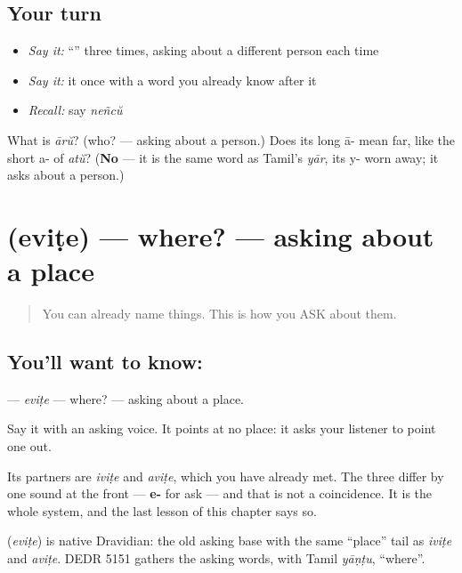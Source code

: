 \subsection*{Your turn}
\begin{itemize}
\raggedright
  \item \emph{Say it:} \textquotedblleft{}\textquotedblright{} three times, asking about a different person each time
  \item \emph{Say it:} it once with a word you already know after it
  \item \emph{Recall:} say \emph{neñcŭ}
\end{itemize}

\begin{tcolorbox}[breakable,colback=teal!4,colframe=teal!35!black,title={Before you move on}]
What is \emph{ārŭ}? (who? — asking about a person.) Does its long ā- mean far, like the short a- of \emph{atŭ}? (\textbf{No} — it is the same word as Tamil's \emph{yār}, its y- worn away; it asks about a person.)
\end{tcolorbox}
\section[\texorpdfstring{\ml{എവിടെ} (eviṭe)}{എവിടെ (eviṭe)}]{ (eviṭe) — where? — asking about a place}

\label{lesson:ML-C41-where}



\begin{quote}
You can already name things. This is how you ASK about them.
\end{quote}

\subsection*{You'll want to know: }
\textbf{} — \emph{eviṭe} — where? — asking about a place.

Say it with an asking voice. It points at no place: it asks your listener to point one out.

Its partners are \textbf{} \emph{iviṭe} and \textbf{} \emph{aviṭe}, which you have already met. The three differ by one sound at the front — \textbf{e-} for ask — and that is not a coincidence. It is the whole system, and the last lesson of this chapter says so.

\begin{cousinweb}
\textbf{} (\emph{eviṭe}) is native Dravidian: the old asking base with the same \textquotedblleft{}place\textquotedblright{} tail as \emph{iviṭe} and \emph{aviṭe}. DEDR 5151 gathers the asking words, with Tamil \emph{yāṇṭu}, \textquotedblleft{}where\textquotedblright{}.
\end{cousinweb}

